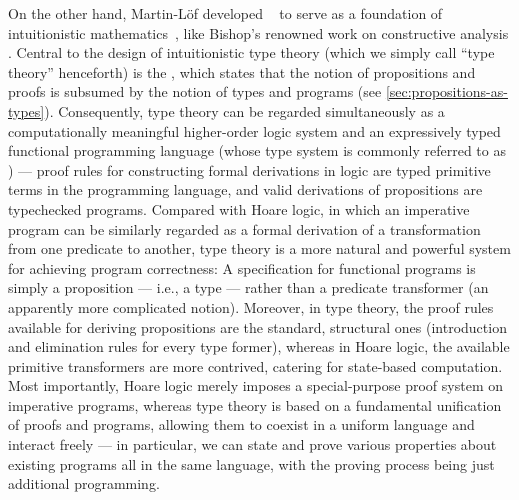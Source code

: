 On the other hand, Martin-Löf developed ~\citep{ML-TT73, ML-TT84, Nordstrom-programming} to serve as a foundation of intuitionistic mathematics~\citep{Heyting-intuitionism, Dummett-intuitionism}, like Bishop's renowned work on constructive analysis \citep{Bishop-analysis}.
Central to the design of intuitionistic type theory (which we simply call ``type theory'' henceforth) is the , which states that the notion of propositions and proofs is subsumed by the notion of types and programs (see \autoref{sec:propositions-as-types}).
Consequently, type theory can be regarded simultaneously as a computationally meaningful higher-order logic system and an expressively typed functional programming language (whose type system is commonly referred to as ) --- proof rules for constructing formal derivations in logic are typed primitive terms in the programming language, and valid derivations of propositions are typechecked programs.
Compared with Hoare logic, in which an imperative program can be similarly regarded as a formal derivation of a transformation from one predicate to another, type theory is a more natural and powerful system for achieving program correctness:
A specification for functional programs is simply a proposition --- i.e., a type --- rather than a predicate transformer (an apparently more complicated notion).
Moreover, in type theory, the proof rules available for deriving propositions are the standard, structural ones (introduction and elimination rules for every type former), whereas in Hoare logic, the available primitive transformers are more contrived, catering for state-based computation.
Most importantly, Hoare logic merely imposes a special-purpose proof system on imperative programs, whereas type theory is based on a fundamental unification of proofs and programs, allowing them to coexist in a uniform language and interact freely --- in particular, we can state and prove various properties about existing programs all in the same language, with the proving process being just additional programming.

